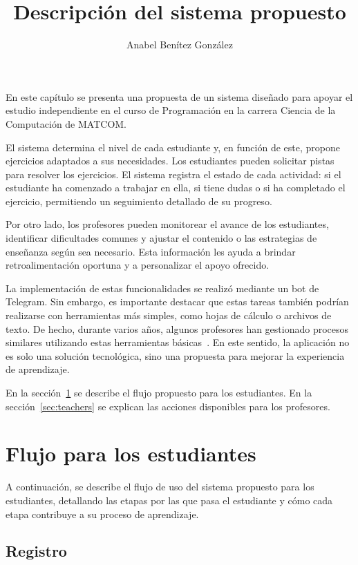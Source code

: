 \documentclass{article}
\title{Descripción del sistema propuesto}
\author{Anabel Benítez González}
\date{}
\begin{document}
\maketitle

En este capítulo se presenta una propuesta de un sistema diseñado para apoyar el estudio independiente en el curso de Programación en la carrera Ciencia de la Computación de \mbox{MATCOM}.

El sistema determina el nivel de cada estudiante y, en función de este, propone ejercicios adaptados a sus necesidades. Los estudiantes pueden solicitar pistas para resolver los ejercicios. El sistema registra el estado de cada actividad: si el estudiante ha comenzado a trabajar en ella, si tiene dudas o si ha completado el ejercicio, permitiendo un seguimiento detallado de su progreso.

Por otro lado, los profesores pueden monitorear el avance de los estudiantes, identificar dificultades comunes y ajustar el contenido o las estrategias de enseñanza según sea necesario. Esta información les ayuda a brindar retroalimentación oportuna y a personalizar el apoyo ofrecido.

La implementación de estas funcionalidades se realizó mediante un bot de Telegram. Sin embargo, es importante destacar que estas tareas también podrían realizarse con herramientas más simples, como hojas de cálculo o archivos de texto. De hecho, durante varios años, algunos profesores han gestionado procesos similares utilizando estas herramientas básicas~\cite{rodriguez}. En este sentido, la aplicación no es solo una solución tecnológica, sino una propuesta para mejorar la experiencia de aprendizaje.

En la sección~\ref{sec:students} se describe el flujo propuesto para los estudiantes. En la sección~\ref{sec:teachers} se explican las acciones disponibles para los profesores.

\section{Flujo para los estudiantes}\label{sec:students}

A continuación, se describe el flujo de uso del sistema propuesto para los estudiantes, detallando las etapas por las que pasa el estudiante y cómo cada etapa contribuye a su proceso de aprendizaje.

\subsection{Registro}
\end{document}
